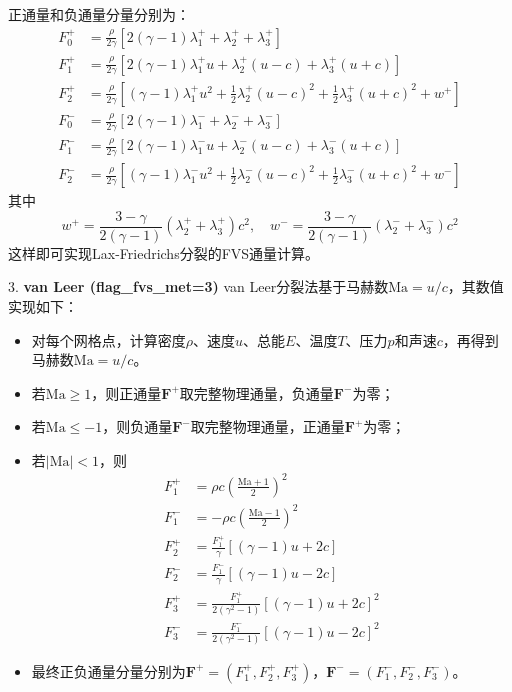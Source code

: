 \documentclass[12pt,a4paper]{article}
\begin{document}
    正通量和负通量分量分别为：
    \begin{align*}
    F^+_0 &= \frac{\rho}{2\gamma} \left[2(\gamma-1)\lambda_1^+ + \lambda_2^+ + \lambda_3^+\right] \\
    F^+_1 &= \frac{\rho}{2\gamma} \left[2(\gamma-1)\lambda_1^+ u + \lambda_2^+(u-c) + \lambda_3^+(u+c)\right] \\
    F^+_2 &= \frac{\rho}{2\gamma} \left[(\gamma-1)\lambda_1^+ u^2 + \frac{1}{2}\lambda_2^+(u-c)^2 + \frac{1}{2}\lambda_3^+(u+c)^2 + w^+\right] \\
    F^-_0 &= \frac{\rho}{2\gamma} \left[2(\gamma-1)\lambda_1^- + \lambda_2^- + \lambda_3^-\right] \\
    F^-_1 &= \frac{\rho}{2\gamma} \left[2(\gamma-1)\lambda_1^- u + \lambda_2^-(u-c) + \lambda_3^-(u+c)\right] \\
    F^-_2 &= \frac{\rho}{2\gamma} \left[(\gamma-1)\lambda_1^- u^2 + \frac{1}{2}\lambda_2^-(u-c)^2 + \frac{1}{2}\lambda_3^-(u+c)^2 + w^-\right]
    \end{align*}
    其中
    $$
    w^+ = \frac{3-\gamma}{2(\gamma-1)}(\lambda_2^+ + \lambda_3^+)c^2, \quad
    w^- = \frac{3-\gamma}{2(\gamma-1)}(\lambda_2^- + \lambda_3^-)c^2
    $$
    这样即可实现Lax-Friedrichs分裂的FVS通量计算。

3. \textbf{van Leer (flag\_fvs\_met=3)}  
    van Leer分裂法基于马赫数$\mathrm{Ma}=u/c$，其数值实现如下：

    \begin{itemize}
        \item 对每个网格点，计算密度$\rho$、速度$u$、总能$E$、温度$T$、压力$p$和声速$c$，再得到马赫数$\mathrm{Ma}=u/c$。
        \item 若$\mathrm{Ma} \geq 1$，则正通量$\mathbf{F}^+$取完整物理通量，负通量$\mathbf{F}^-$为零；
        \item 若$\mathrm{Ma} \leq -1$，则负通量$\mathbf{F}^-$取完整物理通量，正通量$\mathbf{F}^+$为零；
        \item 若$|\mathrm{Ma}| < 1$，则
        \begin{align*}
            F_1^+ &= \rho c \left(\frac{\mathrm{Ma}+1}{2}\right)^2 \\
            F_1^- &= -\rho c \left(\frac{\mathrm{Ma}-1}{2}\right)^2 \\
            F_2^+ &= \frac{F_1^+}{\gamma} \left[(\gamma-1)u + 2c\right] \\
            F_2^- &= \frac{F_1^-}{\gamma} \left[(\gamma-1)u - 2c\right] \\
            F_3^+ &= \frac{F_1^+}{2(\gamma^2-1)} \left[(\gamma-1)u + 2c\right]^2 \\
            F_3^- &= \frac{F_1^-}{2(\gamma^2-1)} \left[(\gamma-1)u - 2c\right]^2
        \end{align*}
        \item 最终正负通量分量分别为$\mathbf{F}^+ = (F_1^+, F_2^+, F_3^+)$，$\mathbf{F}^- = (F_1^-, F_2^-, F_3^-)$。
    \end{itemize}
\end{document}
